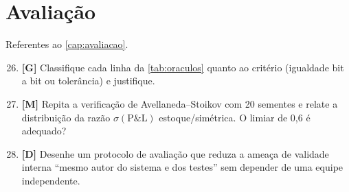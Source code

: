 \section*{Avaliação}
Referentes ao \autoref{cap:avaliacao}.


\begin{enumerate}
  \setcounter{enumi}{25}
  \item \textbf{[G]} Classifique cada linha da \autoref{tab:oraculos} quanto ao critério (igualdade bit a bit ou tolerância) e justifique.
  \item \textbf{[M]} Repita a verificação de Avellaneda--Stoikov com 20 sementes e relate a distribuição da razão $\sigma(\text{P\&L})$ estoque/simétrica. O limiar de 0,6 é adequado?
  \item \textbf{[D]} Desenhe um protocolo de avaliação que reduza a ameaça de validade interna ``mesmo autor do sistema e dos testes'' sem depender de uma equipe independente.
\end{enumerate}
